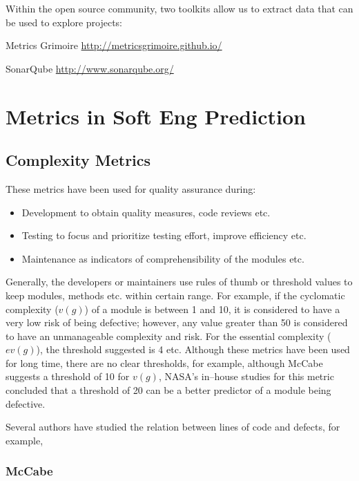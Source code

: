 \documentclass[]{book}
\providecommand{\tightlist}{%
  \setlength{\itemsep}{0pt}\setlength{\parskip}{0pt}}
\theoremstyle{definition}
\theoremstyle{definition}
\theoremstyle{remark}
\begin{document}
Within the open source community, two toolkits allow us to extract data
that can be used to explore projects:

Metrics Grimoire \url{http://metricsgrimoire.github.io/}

SonarQube \url{http://www.sonarqube.org/}

\chapter{Metrics in Soft Eng
Prediction}\label{metrics-in-soft-eng-prediction}

\section{Complexity Metrics}\label{complexity-metrics}

These metrics have been used for quality assurance during:

\begin{itemize}
\tightlist
\item
  Development to obtain quality measures, code reviews etc.
\item
  Testing to focus and prioritize testing effort, improve efficiency
  etc.
\item
  Maintenance as indicators of comprehensibility of the modules etc.
\end{itemize}

Generally, the developers or maintainers use rules of thumb or threshold
values to keep modules, methods etc. within certain range. For example,
if the cyclomatic complexity (\(v(g)\)) of a module is between 1 and 10,
it is considered to have a very low risk of being defective; however,
any value greater than 50 is considered to have an unmanageable
complexity and risk. For the essential complexity (\(ev(g)\)), the
threshold suggested is 4 etc. Although these metrics have been used for
long time, there are no clear thresholds, for example, although McCabe
suggests a threshold of 10 for \(v(g)\), NASA's in--house studies for
this metric concluded that a threshold of 20 can be a better predictor
of a module being defective.

Several authors have studied the relation between lines of code and
defects, for example, \citep{Zhang2009}

\subsection{McCabe}\label{mccabe}
\end{document}
